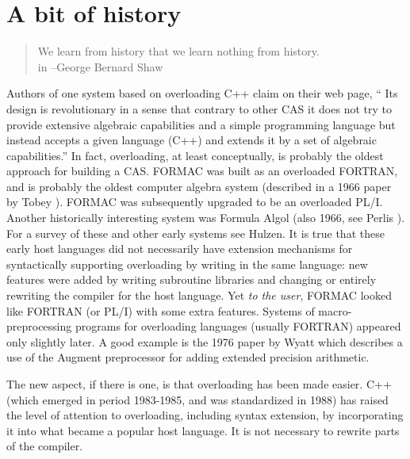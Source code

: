 \documentclass{article}
\begin{document}
\section{A bit of history}
\begin{quote}
    We learn from history that we learn nothing from history.\\
 in --George Bernard Shaw
\end{quote}
Authors of one system based on overloading C++ claim on their web
page, `` Its design is revolutionary in a sense that contrary to other
CAS it does not try to provide extensive algebraic capabilities and a
simple programming language but instead accepts a given language (C++)
and extends it by a set of algebraic capabilities.''
In fact, overloading, at least conceptually, is probably the oldest
approach for building a CAS.  FORMAC was built as an overloaded
FORTRAN, and is probably the oldest computer algebra system (described
in a 1966 paper by Tobey \cite{tobey}). FORMAC was subsequently upgraded
to be an overloaded PL/I. Another historically interesting system was
Formula Algol (also 1966, see Perlis \cite{perlis}). For
a survey of these and other early systems see Hulzen\cite{hulzen}.
It is true that these early host languages did not necessarily
have extension
mechanisms for syntactically supporting overloading by writing
in the same language: new features were
added by writing subroutine libraries and changing or entirely
rewriting the compiler for the host language.  Yet {\em to the user}, FORMAC
looked like FORTRAN (or PL/I) with some extra features.  Systems of
macro-preprocessing programs for overloading languages (usually
FORTRAN) appeared only slightly later. A good example is the 1976
paper by Wyatt \cite{wyatt} which describes a use of the Augment
preprocessor for adding extended precision arithmetic.

The new aspect, if there is one, is that overloading has
been made easier. C++ (which emerged in period
1983-1985, and was standardized in 1988) has raised the level of
attention to overloading, including syntax extension,
by incorporating it into what became a popular host language. It is
not necessary to rewrite parts of the compiler.
\end{document}
